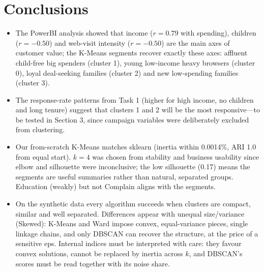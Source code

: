 \documentclass[11pt]{article}
\begin{document}
\section{Conclusions}
\begin{itemize}
\item The PowerBI analysis showed that income ($r=0.79$ with spending), children ($r=-0.50$) and
web-visit intensity ($r=-0.50$) are the main axes of customer value; the K-Means segments recover
exactly these axes: affluent child-free big spenders (cluster 1), young low-income heavy browsers
(cluster 0), loyal deal-seeking families (cluster 2) and new low-spending families (cluster 3).
\item The response-rate patterns from Task 1 (higher for high income, no children and long tenure)
suggest that clusters 1 and 2 will be the most responsive---to be tested in Section 3, since campaign
variables were deliberately excluded from clustering.
\item Our from-scratch K-Means matches sklearn (inertia within 0.0014\%, ARI 1.0 from equal start).
$k=4$ was chosen from stability and business usability since elbow and silhouette were inconclusive;
the low silhouette (0.17) means the segments are useful summaries rather than natural, separated groups.
Education (weakly) but not Complain aligns with the segments.
\item On the synthetic data every algorithm succeeds when clusters are compact, similar and well
separated. Differences appear with unequal size/variance (Skewed): K-Means and Ward impose convex,
equal-variance pieces, single linkage chains, and only DBSCAN can recover the structure, at the price
of a sensitive eps. Internal indices must be interpreted with care: they favour convex solutions,
cannot be replaced by inertia across $k$, and DBSCAN's scores must be read together with its noise share.
\end{itemize}
\end{document}

